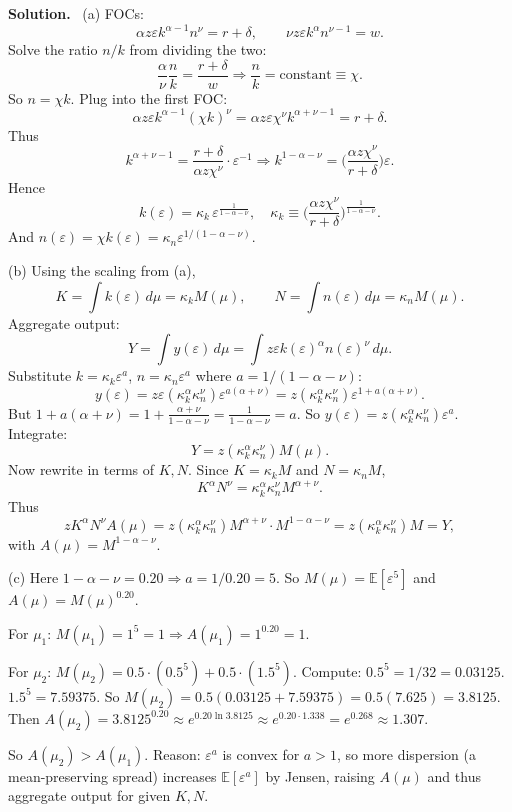 \documentclass[12pt]{article}
\newenvironment{sol}{\par\medskip\noindent\textbf{Solution.}\ }{\par\medskip}
\newcommand{\E}{\mathbb{E}}
\begin{document}
\begin{sol}
(a) FOCs:
\[
\alpha z\varepsilon k^{\alpha-1}n^\nu=r+\delta,
\qquad
\nu z\varepsilon k^\alpha n^{\nu-1}=w.
\]
Solve the ratio \(n/k\) from dividing the two:
\[
\frac{\alpha}{\nu}\frac{n}{k}=\frac{r+\delta}{w}
\Rightarrow \frac{n}{k}=\text{constant}\equiv \chi.
\]
So \(n=\chi k\). Plug into the first FOC:
\[
\alpha z\varepsilon k^{\alpha-1}(\chi k)^\nu
=\alpha z\varepsilon \chi^\nu k^{\alpha+\nu-1}
=r+\delta.
\]
Thus
\[
k^{\alpha+\nu-1}=\frac{r+\delta}{\alpha z\chi^\nu}\cdot \varepsilon^{-1}
\Rightarrow
k^{1-\alpha-\nu}=\Big(\frac{\alpha z\chi^\nu}{r+\delta}\Big)\varepsilon.
\]
Hence
\[
k(\varepsilon)=\kappa_k\,\varepsilon^{\frac{1}{1-\alpha-\nu}},
\quad
\kappa_k\equiv \Big(\frac{\alpha z\chi^\nu}{r+\delta}\Big)^{\frac{1}{1-\alpha-\nu}}.
\]
And \(n(\varepsilon)=\chi k(\varepsilon)=\kappa_n \varepsilon^{1/(1-\alpha-\nu)}\).

(b) Using the scaling from (a),
\[
K=\int k(\varepsilon)\,d\mu = \kappa_k M(\mu),
\qquad
N=\int n(\varepsilon)\,d\mu = \kappa_n M(\mu).
\]
Aggregate output:
\[
Y=\int y(\varepsilon)\,d\mu
= \int z\varepsilon k(\varepsilon)^\alpha n(\varepsilon)^\nu\,d\mu.
\]
Substitute \(k=\kappa_k \varepsilon^{a}\), \(n=\kappa_n \varepsilon^{a}\) where \(a=1/(1-\alpha-\nu)\):
\[
y(\varepsilon)= z\varepsilon (\kappa_k^\alpha \kappa_n^\nu)\varepsilon^{a(\alpha+\nu)}
= z(\kappa_k^\alpha \kappa_n^\nu)\varepsilon^{1+a(\alpha+\nu)}.
\]
But \(1+a(\alpha+\nu)=1+\frac{\alpha+\nu}{1-\alpha-\nu}=\frac{1}{1-\alpha-\nu}=a\).
So \(y(\varepsilon)= z(\kappa_k^\alpha \kappa_n^\nu)\varepsilon^{a}\).
Integrate:
\[
Y=z(\kappa_k^\alpha \kappa_n^\nu) M(\mu).
\]
Now rewrite in terms of \(K,N\). Since \(K=\kappa_k M\) and \(N=\kappa_n M\),
\[
K^\alpha N^\nu = \kappa_k^\alpha \kappa_n^\nu M^{\alpha+\nu}.
\]
Thus
\[
zK^\alpha N^\nu A(\mu)
=
z(\kappa_k^\alpha \kappa_n^\nu) M^{\alpha+\nu}\cdot M^{1-\alpha-\nu}
=
z(\kappa_k^\alpha \kappa_n^\nu)M
=Y,
\]
with \(A(\mu)=M^{1-\alpha-\nu}\).

(c) Here \(1-\alpha-\nu=0.20\Rightarrow a=1/0.20=5\).
So \(M(\mu)=\E[\varepsilon^5]\) and \(A(\mu)=M(\mu)^{0.20}\).

For \(\mu_1\): \(M(\mu_1)=1^5=1\Rightarrow A(\mu_1)=1^{0.20}=1.\)

For \(\mu_2\): \(M(\mu_2)=0.5\cdot (0.5^5)+0.5\cdot(1.5^5)\).
Compute: \(0.5^5=1/32=0.03125\). \(1.5^5=7.59375\).
So \(M(\mu_2)=0.5(0.03125+7.59375)=0.5(7.625)=3.8125.\)
Then \(A(\mu_2)=3.8125^{0.20}\approx e^{0.20\ln 3.8125}\approx e^{0.20\cdot 1.338}=e^{0.268}\approx 1.307.\)

So \(A(\mu_2)>A(\mu_1)\).
Reason: \(\varepsilon^{a}\) is convex for \(a>1\), so more dispersion (a mean-preserving spread) increases \(\E[\varepsilon^a]\) by Jensen,
raising \(A(\mu)\) and thus aggregate output for given \(K,N\).
\end{sol}
\end{document}

